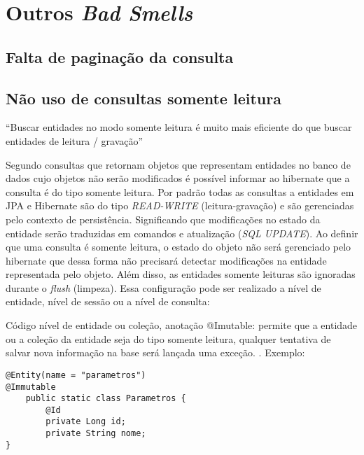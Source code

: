 

\section{Outros \textit{Bad Smells}}

\subsection{Falta de paginação da consulta}


\subsection{Não uso de consultas somente leitura}

“Buscar entidades no modo somente leitura é muito mais eficiente do que buscar entidades de leitura / gravação” \citep[s.~15.53]{hibernate_543} 

Segundo \cite{vlad_mihalcea_2019} consultas que retornam objetos que representam entidades no banco de dados cujo objetos não serão modificados é possível informar ao hibernate que a consulta é do tipo somente leitura. Por padrão todas as consultas a entidades em JPA e Hibernate são do tipo \textit{READ-WRITE} (leitura-gravação) e são gerenciadas pelo contexto de persistência. Significando que modificações no estado da entidade serão traduzidas em comandos e atualização (\textit{SQL UPDATE}). Ao definir que uma consulta é somente leitura, o estado do objeto não será gerenciado pelo hibernate que dessa forma não precisará detectar modificações na entidade representada pelo objeto. Além disso, as entidades somente leituras são ignoradas durante o \textit{flush} (limpeza). Essa configuração pode ser realizado a nível de entidade, nível de sessão ou a nível de consulta:

Código nível de entidade ou coleção, anotação @Imutable:
permite que a entidade ou a coleção da entidade seja do tipo somente leitura, qualquer tentativa de salvar nova informação na base será lançada uma exceção. \cite{hibernate_543}. Exemplo:

\begin{scriptsize}
\estiloJava
\begin{lstlisting}[caption={utilização @Imutable}, label=lst:javacode]
@Entity(name = "parametros")
@Immutable
    public static class Parametros {
        @Id
	    private Long id;
	    private String nome;
}   
\end{lstlisting}
\end{scriptsize}

